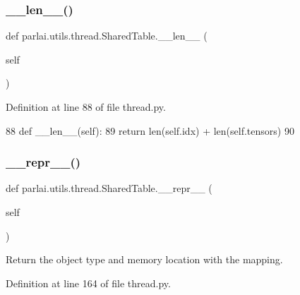 \subsubsection{\texorpdfstring{\+\_\+\+\_\+len\+\_\+\+\_\+()}{\_\_len\_\_()}}
{\footnotesize\ttfamily def parlai.\+utils.\+thread.\+Shared\+Table.\+\_\+\+\_\+len\+\_\+\+\_\+ (\begin{DoxyParamCaption}\item[{}]{self }\end{DoxyParamCaption})}



Definition at line 88 of file thread.\+py.


\begin{DoxyCode}
88     \textcolor{keyword}{def }\_\_len\_\_(self):
89         \textcolor{keywordflow}{return} len(self.idx) + len(self.tensors)
90 
\end{DoxyCode}
\mbox{\label{classparlai_1_1utils_1_1thread_1_1SharedTable_af4577c8c954666ac3905a6215835bbd0}} 
\subsubsection{\texorpdfstring{\+\_\+\+\_\+repr\+\_\+\+\_\+()}{\_\_repr\_\_()}}
{\footnotesize\ttfamily def parlai.\+utils.\+thread.\+Shared\+Table.\+\_\+\+\_\+repr\+\_\+\+\_\+ (\begin{DoxyParamCaption}\item[{}]{self }\end{DoxyParamCaption})}

\begin{DoxyVerb}Return the object type and memory location with the mapping.
\end{DoxyVerb}
 

Definition at line 164 of file thread.\+py.


